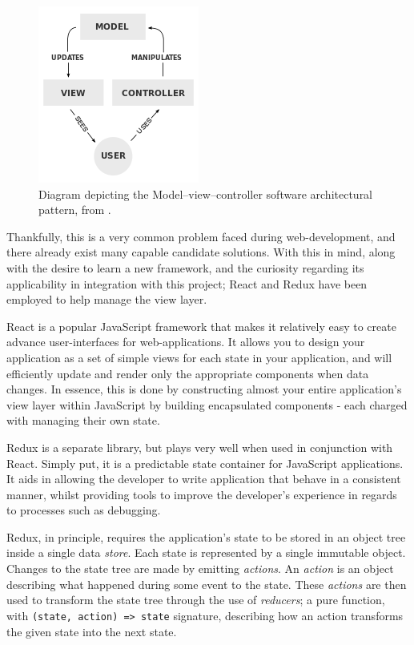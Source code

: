 \documentclass{standalone}
\begin{document}
			\begin{figure}[!htbp]
				\centering
				\includegraphics{resources/images/mvc.png}
				\caption{Diagram depicting the Model–view–controller software architectural pattern, from \parencite{MVC}.}
			\end{figure}

			\label{redux}
			Thankfully, this is a very common problem faced during web-development, and there already exist many capable candidate solutions. With this in mind, along with the desire to learn a new framework, and the curiosity regarding its applicability in integration with this project; React\parencite{React} and Redux\parencite{Redux} have been employed to help manage the view layer.

			React is a popular JavaScript framework that makes it relatively easy to create advance user-interfaces for web-applications. It allows you to design your application as a set of simple views for each state in your application, and will efficiently update and render only the appropriate components when data changes. In essence, this is done by constructing almost your entire application's view layer within JavaScript by building encapsulated components - each charged with managing their own state.

			Redux is a separate library, but plays very well when used in conjunction with React. Simply put, it is a predictable state container for JavaScript applications. It aids in allowing the developer to write application that behave in a consistent manner, whilst providing tools to improve the developer's experience in regards to processes such as debugging.

			Redux, in principle, requires the application's state to be stored in an object tree inside a single data \emph{store}. Each state is represented by a single immutable object. Changes to the state tree are made by emitting \emph{actions}. An \emph{action} is an object describing what happened during some event to the state. These \emph{actions} are then used to transform the state tree through the use of \emph{reducers}; a pure function, with \texttt{(state, action) => state} signature, describing how an action transforms the given state into the next state.
\end{document}
